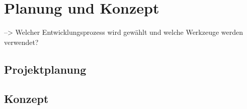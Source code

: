\chapter{Planung und Konzept} \label{planung}
--> Welcher Entwicklungsprozess wird gewählt und welche Werkzeuge werden verwendet?


\section{Projektplanung} \label{projektplan}



\section{Konzept} \label{konzept}
